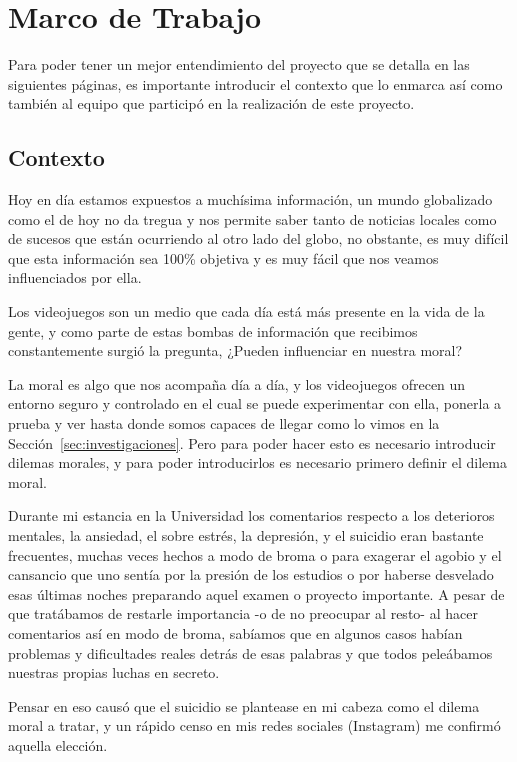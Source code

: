 \section{Marco de Trabajo}

Para poder tener un mejor entendimiento del proyecto que se detalla en las siguientes páginas, es importante introducir el contexto que lo enmarca así como también al equipo que participó en la realización de este proyecto.

\subsection{Contexto}

Hoy en día estamos expuestos a muchísima información, un mundo globalizado como el de hoy no da tregua y nos permite saber tanto de noticias locales como de sucesos que están ocurriendo al otro lado del globo, no obstante, es muy difícil que esta información sea 100\% objetiva y es muy fácil que nos veamos influenciados por ella\cite{mass-media}.

Los videojuegos son un medio que cada día está más presente en la vida de la gente, y como parte de estas bombas de información que recibimos constantemente surgió la pregunta, ¿Pueden influenciar en nuestra moral?

La moral es algo que nos acompaña día a día, y los videojuegos ofrecen un entorno seguro y controlado en el cual se puede experimentar con ella, ponerla a prueba y ver hasta donde somos capaces de llegar como lo vimos en la Sección~\ref{sec:investigaciones}. Pero para poder hacer esto es necesario introducir dilemas morales, y para poder introducirlos es necesario primero definir el dilema moral.

Durante mi estancia en la Universidad los comentarios respecto a los deterioros mentales, la ansiedad, el sobre estrés, la depresión, y el suicidio eran bastante frecuentes, muchas veces hechos a modo de broma o para exagerar el agobio y el cansancio que uno sentía por la presión de los estudios o por haberse desvelado esas últimas noches preparando aquel examen o proyecto importante. A pesar de que tratábamos de restarle importancia -o de no preocupar al resto- al hacer comentarios así en modo de broma, sabíamos que en algunos casos habían problemas y dificultades reales detrás de esas palabras y que todos peleábamos nuestras propias luchas en secreto.

Pensar en eso causó que el suicidio se plantease en mi cabeza como el dilema moral a tratar, y un rápido censo en mis redes sociales (Instagram) me confirmó aquella elección.

